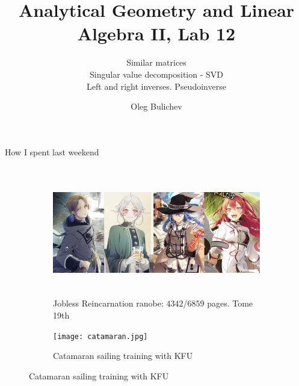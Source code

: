 \documentclass[aspectratio=169]{beamer}
\title[AGLA2]{Analytical Geometry and Linear Algebra II, Lab 12} %
\subtitle{Similar matrices \\ Singular value decomposition - SVD \\ Left and right inverses. Pseudoinverse
         } %
\author{Oleg Bulichev}
\newcommand{\fbckg}[1]{\usebackgroundtemplate{\texttt{[image: \#1]}}}%
\begin{document}
\setlength{\abovedisplayskip}{0pt}
\setlength{\belowdisplayskip}{0pt}
\setlength{\abovedisplayshortskip}{0pt}
\setlength{\belowdisplayshortskip}{0pt}

\fbckg{fibeamer/figs/title_page.png}

\fbckg{fibeamer/figs/common.png}

\begin{frame}[c]{How I spent last weekend}
    \framesubtitle{}
    \begin{figure}[H]
        \begin{subfigure}{0.64\textwidth}
            \centering\includegraphics[height=5.5cm,width=1\textwidth,keepaspectratio]{jobless_reincarnation.jpg}
            \caption*{Jobless Reincarnation ranobe: $4342/6859$ pages. Tome 19th}
        \end{subfigure}     
        \hfill
        \begin{subfigure}{0.34\textwidth}
            \centering\texttt{[image: catamaran.jpg]}
            \caption*{Catamaran sailing training with KFU}
        \end{subfigure}
    \end{figure}
\end{frame}
\end{document}
